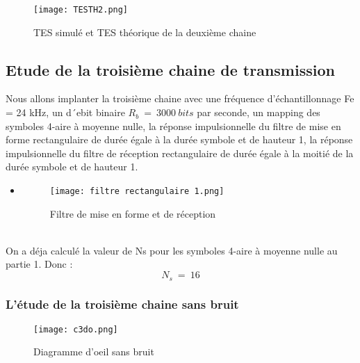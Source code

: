 \documentclass[11pt]{article}
\begin{document}
\begin{figure}[h]
  \centering
  \texttt{[image: TESTH2.png]}
  \caption{TES simulé et TES théorique de la deuxième chaine}
  \label{fig:nom_de_la_figure}
  \vspace{0.2cm}
\end{figure}

\newpage
    \subsection{Etude de la troisième chaine de transmission}
    Nous allons implanter la troisième chaine avec une fréquence d’échantillonnage
Fe = 24 kHz, un d´ebit binaire $R_b \ = \ 3000 \ bits$ par seconde, un mapping des symboles 4-aire à moyenne nulle, la réponse impulsionnelle du filtre de mise en forme rectangulaire de durée égale à la durée symbole et de hauteur 1, la réponse impulsionnelle du filtre de réception  rectangulaire de durée égale à la moitié de la durée symbole et de hauteur 1. \\
\begin{itemize}
\item 

\begin{figure}[ht!]
            \centering
            \texttt{[image: filtre rectangulaire 1.png]}
            \caption{Filtre de mise en forme et de réception
            \label{fig : OeilBW1}}
\end{figure}
\end{itemize}

\\On a déja calculé la valeur de Ns pour les symboles 4-aire à moyenne nulle au partie 1. Donc :
$$N_s \ = \ 16$$

\subsubsection{L'étude de la troisième chaine sans bruit}
\begin{figure}[ht!]
            \centering
            \texttt{[image: c3do.png]}
            \caption{Diagramme d'oeil sans bruit
            \label{fig : OeilBW1}}
\end{figure}
\end{document}
